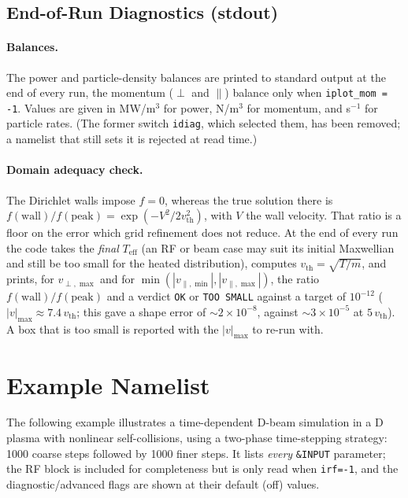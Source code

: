 \documentclass[11pt,a4paper]{article}
\newcommand{\vpmax}{v_{\perp,\max}}
\newcommand{\vpamin}{v_{\parallel,\min}}
\newcommand{\vpamax}{v_{\parallel,\max}}
\begin{document}
\subsection{End-of-Run Diagnostics (stdout)}
\label{sec:endofrun}

\paragraph{Balances.}  The power and particle-density balances are printed to
standard output at the end of every run, the momentum ($\perp$ and
$\parallel$) balance only when \texttt{iplot\_mom = -1}.  Values are given in
MW/m$^3$ for power, N/m$^3$ for momentum, and s$^{-1}$ for particle rates.
(The former switch \texttt{idiag}, which selected them, has been removed; a
namelist that still sets it is rejected at read time.)

\paragraph{Domain adequacy check.}  The Dirichlet walls impose $f=0$, whereas
the true solution there is $f(\text{wall})/f(\text{peak}) =
\exp(-V^2/2v_\mathrm{th}^2)$, with $V$ the wall velocity.  That ratio is a floor
on the error which grid refinement does not reduce.  At the end of every run the
code takes the \emph{final} $T_\mathrm{eff}$ (an RF or beam case may suit its
initial Maxwellian and still be too small for the heated distribution),
computes $v_\mathrm{th}=\sqrt{T/m}$, and prints, for $\vpmax$ and for
$\min(|\vpamin|,|\vpamax|)$, the ratio $f(\text{wall})/f(\text{peak})$ and a
verdict \texttt{OK} or \texttt{TOO SMALL} against a target of $10^{-12}$
($|v|_{\max}\approx 7.4\,v_\mathrm{th}$; this gave a shape error of
${\sim}2\times10^{-8}$, against ${\sim}3\times10^{-5}$ at $5\,v_\mathrm{th}$).
A box that is too small is reported with the $|v|_{\max}$ to re-run with.


\section{Example Namelist}

The following example illustrates a time-dependent D-beam simulation in a D
plasma with nonlinear self-collisions, using a two-phase time-stepping
strategy: 1000 coarse steps followed by 1000 finer steps. It lists \emph{every}
\texttt{\&INPUT} parameter; the RF block is included for completeness but is only
read when \texttt{irf=-1}, and the diagnostic/advanced flags are shown at their
default (off) values.
\end{document}
